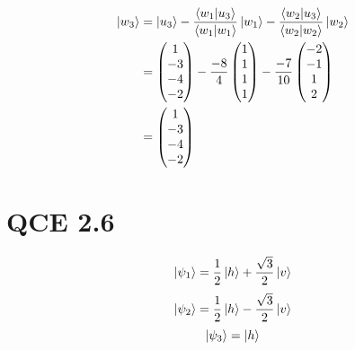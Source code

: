 \documentclass[10pt]{article}
\begin{document}
\begin{align*}
\ket{w_3} &= \ket{u_3} - \frac{ \braket{ w_1 | u_3 } }{ \braket{ w_1 | w_1 } } \ket{w_1} - \frac{ \braket{ w_2 | u_3 } }{ \braket{  w_2 | w_2  } } \ket{w_2} \\
               &= \begin{pmatrix}
               1 \\
               -3 \\
               -4 \\
               -2
               \end{pmatrix} - \frac{ -8 }{ 4 } \begin{pmatrix}
               1 \\
               1 \\
               1 \\
               1
               \end{pmatrix} - \frac{ -7 }{ 10 } \begin{pmatrix}
               -2 \\
               -1 \\
               1 \\
               2
               \end{pmatrix} \\
               &= \begin{pmatrix}
               1 \\
               -3 \\
               -4 \\
               -2
               \end{pmatrix}
\end{align*}
\section*{QCE 2.6}
\[
\ket{\psi_1} = \frac{1}{2}\ket{h} + \frac{\sqrt{3}}{2} \ket{v}
\]
\[
\ket{\psi_2} = \frac{1}{2}\ket{h} - \frac{\sqrt{3}}{2} \ket{v}
\]
\[
\ket{\psi_3} = \ket{h}
\]
\end{document}
